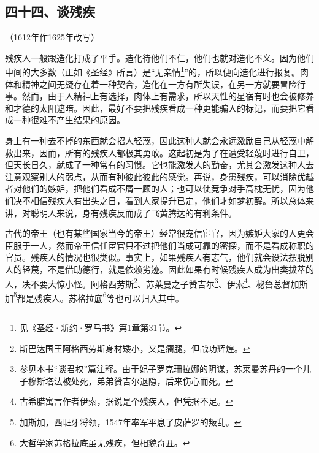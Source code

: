 \subsection*{四十四、谈残疾}
\begin{center}
    （1612年作1625年改写）
\end{center}
\par 残疾人一般跟造化打成了平手。造化待他们不仁，他们也就对造化不义。因为他们中间的大多数（正如《圣经》所言）是“无亲情\footnote{见《圣经·新约·罗马书》第1章第31节。}”的，所以便向造化进行报复。肉体和精神之间无疑存在着一种契合，造化在一方有所失误，在另一方就要冒险行事。然而，由于人精神上有选择，肉体上有需求，所以天性的星宿有时也会被修养和才德的太阳遮暗。因此，最好不要把残疾看成一种更能骗人的标记，而要把它看成一种很难不产生结果的原因。
\par 身上有一种去不掉的东西就会招人轻蔑，因此这种人就会永远激励自己从轻蔑中解救出来，因而，所有的残疾人都极其勇敢。这起初是为了在遭受轻蔑时进行自卫，但天长日久，就成了一种常有的习惯。它也能激发人的勤奋，尤其会激发这种人去注意观察别人的弱点，从而有种彼此彼此的感觉。再说，身患残疾，可以消除优越者对他们的嫉妒，把他们看成不屑一顾的人；也可以使竞争对手高枕无忧，因为他们决不相信残疾人有出头之日，看到人家提升已定，他们才如梦初醒。所以总体来讲，对聪明人来说，身有残疾反而成了飞黄腾达的有利条件。
\par 古代的帝王（也有某些国家当今的帝王）经常很宠信宦官，因为嫉妒大家的人更会臣服于一人，然而帝王信任宦官只不过把他们当成可靠的密探，而不是看成称职的官员。残疾人的情况也很类似。事实上，如果残疾人有志气，他们就会设法摆脱别人的轻蔑，不是借助德行，就是依赖劣迹。因此如果有时候残疾人成为出类拔萃的人，决不要大惊小怪。阿格西劳斯\footnote{斯巴达国王阿格西劳斯身材矮小，又是瘸腿，但战功辉煌。}、苏莱曼之子赞吉尔\footnote{参见本书“谈君权”篇注释。由于妃子罗克珊拉娜的阴谋，苏莱曼苏丹的一个儿子穆斯塔法被处死，弟弟赞吉尔退隐，后来伤心而死。}、伊索\footnote{古希腊寓言作者伊索，据说是个残疾人，但凭据不足。}、秘鲁总督加斯加\footnote{加斯加，西班牙将领，1547年率军平息了皮萨罗的叛乱。}都是残疾人。苏格拉底\footnote{大哲学家苏格拉底虽无残疾，但相貌奇丑。}等也可以归入其中。




